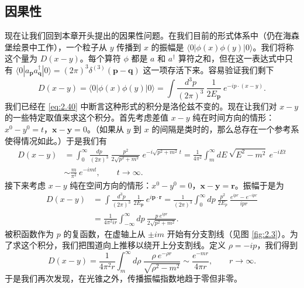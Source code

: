 \subsection{因果性}

现在让我们回到本章开头提出的因果性问题。在我们目前的形式体系中（仍在海森堡绘景中工作），一个粒子从 $y$ 传播到 $x$ 的振幅是 $\langle 0|\phi(x)\phi(y)|0\rangle$。我们将称这个量为 $D(x-y)$。每个算符 $\phi$ 都是 $a$ 和 $a^\dagger$ 算符之和，但在这一表达式中只有 $\langle 0|a_{\mathbf{p}}a_{\mathbf{q}}^\dagger|0\rangle = (2\pi)^3\delta^{(3)}(\mathbf{p}-\mathbf{q})$ 这一项存活下来。容易验证我们剩下
\begin{equation}
  D(x-y) = \langle 0|\phi(x)\phi(y)|0\rangle
  = \int \frac{d^3p}{(2\pi)^3}\ \frac{1}{2E_{\mathbf{p}}}\
    e^{-ip\cdot(x-y)} .
  \label{eq:2.50}
\end{equation}
我们已经在 \eqref{eq:2.40} 中断言这种形式的积分是洛伦兹不变的。现在让我们对 $x-y$ 的一些特定取值来求这个积分。首先考虑差值 $x-y$ 纯在时间方向的情形：$x^0-y^0=t$，$\mathbf{x}-\mathbf{y}=0$。（如果从 $y$ 到 $x$ 的间隔是类时的，那么总存在一个参考系使得情况如此。）于是我们有
\begin{align}
  D(x-y) &= \int_0^\infty \frac{dp}{(2\pi)^3}\ \frac{p^2}{2\sqrt{p^2+m^2}}\
    e^{-i\sqrt{p^2+m^2}\,t}
  = \frac{1}{4\pi^2}\int_m^\infty dE\ \sqrt{E^2-m^2}\ e^{-iEt}\\
  &\sim \frac{m}{\pi^2}\ e^{-imt},\qquad t\to\infty .
  \label{eq:2.51}
\end{align}
接下来考虑 $x-y$ 纯在空间方向的情形：$x^0-y^0=0$，$\mathbf{x}-\mathbf{y}=\mathbf{r}$。振幅于是为
\begin{align}
  D(x-y) &= \int \frac{d^3p}{(2\pi)^3}\ \frac{1}{2E_{\mathbf{p}}}\
    e^{i\mathbf{p}\cdot\mathbf{r}}
  = \frac{1}{(2\pi)^3}\int_0^\infty dp\ \frac{p^2}{2E_p}\
    \frac{e^{ipr}-e^{-ipr}}{ipr}\\
  &= \frac{1}{4\pi^2 i r}\int_{-\infty}^{\infty} dp\ \frac{p\ e^{ipr}}
    {2\sqrt{p^2+m^2}} .
\end{align}
被积函数作为 $p$ 的复函数，在虚轴上从 $\pm im$ 开始有分支割线（见图 \ref{fig:2.3}）。为了求这个积分，我们把围道向上推移以绕开上分支割线。定义 $\rho = -ip$，我们得到
\begin{equation}
  D(x-y) = \frac{1}{4\pi^2 r}\int_m^\infty d\rho\
    \frac{\rho\ e^{-\rho r}}{\sqrt{\rho^2-m^2}}
  \sim \frac{e^{-mr}}{4\pi r},\qquad r\to\infty .
  \label{eq:2.52}
\end{equation}
于是我们再次发现，在光锥之外，传播振幅指数地趋于零但非零。

